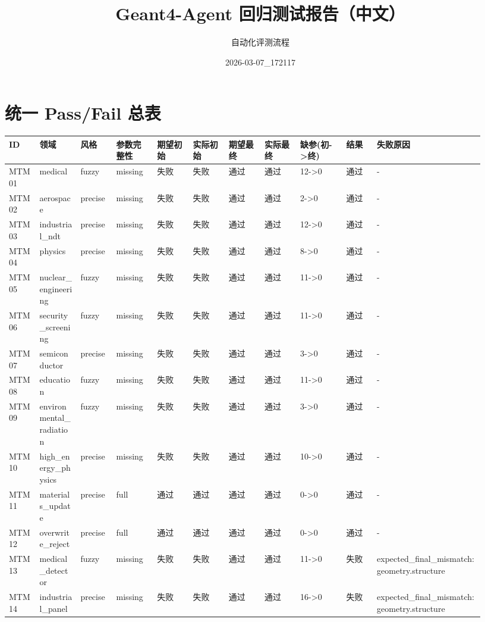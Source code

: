\documentclass[11pt]{ctexart}
\title{Geant4-Agent 回归测试报告（中文）}
\author{自动化评测流程}
\date{2026-03-07\_172117}
\begin{document}
\maketitle
\section{统一 Pass/Fail 总表}
\begin{longtable}{p{0.06\linewidth}p{0.08\linewidth}p{0.07\linewidth}p{0.08\linewidth}p{0.07\linewidth}p{0.07\linewidth}p{0.07\linewidth}p{0.07\linewidth}p{0.09\linewidth}p{0.06\linewidth}p{0.21\linewidth}}
\toprule
ID & 领域 & 风格 & 参数完整性 & 期望初始 & 实际初始 & 期望最终 & 实际最终 & 缺参(初->终) & 结果 & 失败原因 \\
\midrule
MTM01 & medical & fuzzy & missing & 失败 & 失败 & 通过 & 通过 & 12->0 & 通过 & - \\
MTM02 & aerospace & precise & missing & 失败 & 失败 & 通过 & 通过 & 2->0 & 通过 & - \\
MTM03 & industrial\_ndt & precise & missing & 失败 & 失败 & 通过 & 通过 & 12->0 & 通过 & - \\
MTM04 & physics & precise & missing & 失败 & 失败 & 通过 & 通过 & 8->0 & 通过 & - \\
MTM05 & nuclear\_engineering & fuzzy & missing & 失败 & 失败 & 通过 & 通过 & 11->0 & 通过 & - \\
MTM06 & security\_screening & fuzzy & missing & 失败 & 失败 & 通过 & 通过 & 11->0 & 通过 & - \\
MTM07 & semiconductor & precise & missing & 失败 & 失败 & 通过 & 通过 & 3->0 & 通过 & - \\
MTM08 & education & fuzzy & missing & 失败 & 失败 & 通过 & 通过 & 11->0 & 通过 & - \\
MTM09 & environmental\_radiation & fuzzy & missing & 失败 & 失败 & 通过 & 通过 & 3->0 & 通过 & - \\
MTM10 & high\_energy\_physics & precise & missing & 失败 & 失败 & 通过 & 通过 & 10->0 & 通过 & - \\
MTM11 & materials\_update & precise & full & 通过 & 通过 & 通过 & 通过 & 0->0 & 通过 & - \\
MTM12 & overwrite\_reject & precise & full & 通过 & 通过 & 通过 & 通过 & 0->0 & 通过 & - \\
MTM13 & medical\_detector & fuzzy & missing & 失败 & 失败 & 通过 & 通过 & 11->0 & 失败 & expected\_final\_mismatch:geometry.structure \\
MTM14 & industrial\_panel & precise & missing & 失败 & 失败 & 通过 & 通过 & 16->0 & 失败 & expected\_final\_mismatch:geometry.structure \\

\end{longtable}
\end{document}
